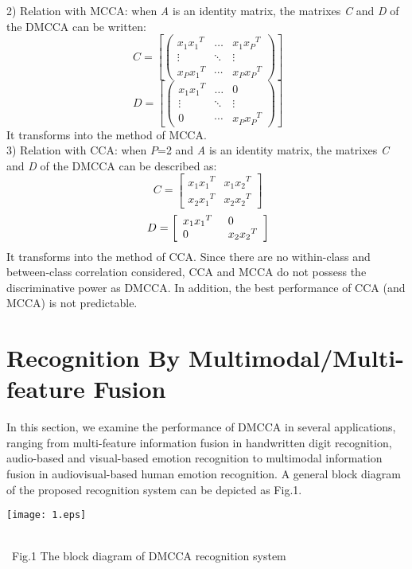 \documentclass[journal]{IEEEtran}
\begin{document}
2)	Relation with MCCA: when \emph{A} is an identity matrix, the matrixes \emph{C} and \emph{D} of the DMCCA can be written:
\begin{equation} \ C = \left[ {\left( {\begin{array}{*{20}{c}}
{{x_1}{x_1}^T}& \ldots &{{x_1}{x_P}^T}\\
 \vdots & \ddots & \vdots \\
{{x_P}{x_1}^T}& \cdots &{{x_P}{x_P}^T}
\end{array}} \right)} \right] \end{equation}
\begin{equation} \ D = \left[ {\left( {\begin{array}{*{20}{c}}
{{x_1}{x_1}^T}& \ldots &0\\
 \vdots & \ddots & \vdots \\
0& \cdots &{{x_P}{x_P}^T}
\end{array}} \right)} \right] \end{equation}
It transforms into the method of MCCA.\\

3)	Relation with CCA: when $P$=2 and \emph{A} is an identity matrix, the matrixes \emph{C} and \emph{D} of the DMCCA can be described as:
\begin{equation} \ C = \left[ \begin{array}{l}
{x_1}{x_1}^T\\
{x_2}{x_1}^T
\end{array} \right.\left. \begin{array}{l}
{x_1}{x_2}^T\\
{x_2}{x_2}^T
\end{array} \right] \end{equation}
\begin{equation} \ D = \left[ \begin{array}{l}
{x_1}{x_1}^T\\
0
\end{array} \right.\left. \begin{array}{l}
{\rm{  }}0\\
{x_2}{x_2}^T
\end{array} \right] \end{equation}
It transforms into the method of CCA. Since there are no within-class and between-class correlation considered, CCA and MCCA do not possess the discriminative power as DMCCA. In addition, the best performance of CCA (and MCCA) is not predictable.
\section{Recognition By Multimodal/Multi-feature Fusion}
In this section, we examine the performance of DMCCA in several applications, ranging from multi-feature information fusion in handwritten digit recognition, audio-based and visual-based emotion recognition to multimodal information fusion in audiovisual-based human emotion recognition. A general block diagram of the proposed recognition system can be depicted as Fig.1.
\centerline {\texttt{[image: 1.eps]}}\\ \ {Fig.1 The block diagram of DMCCA recognition system}\\
\end{document}
